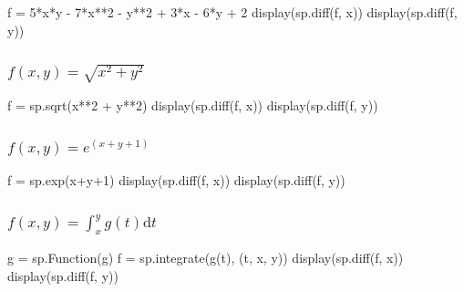 \documentclass[
  letterpaper,
  DIV=11,
  numbers=noendperiod]{scrartcl}
\newenvironment{Shaded}{\begin{snugshade}}{\end{snugshade}}
\newcommand{\NormalTok}[1]{\textcolor[rgb]{0.00,0.23,0.31}{#1}}
\begin{document}
\begin{Shaded}
\begin{Highlighting}[numbers=left,,]
\NormalTok{f = 5*x*y {-} 7*x**2 {-} y**2 + 3*x {-} 6*y + 2}
\NormalTok{display(sp.diff(f, x))}
\NormalTok{display(sp.diff(f, y))}
\end{Highlighting}
\end{Shaded}

\subsubsection{\texorpdfstring{\(f(x, y) = \sqrt{x^2+y^2}\)}{f(x, y) = \textbackslash sqrt\{x\^{}2+y\^{}2\}}}\label{fx-y-sqrtx2y2}

\begin{Shaded}
\begin{Highlighting}[numbers=left,,]
\NormalTok{f = sp.sqrt(x**2 + y**2)}
\NormalTok{display(sp.diff(f, x))}
\NormalTok{display(sp.diff(f, y))}
\end{Highlighting}
\end{Shaded}

\subsubsection{\texorpdfstring{\(f(x, y) = e^{(x+y+1)}\)}{f(x, y) = e\^{}\{(x+y+1)\}}}\label{fx-y-exy1}

\begin{Shaded}
\begin{Highlighting}[numbers=left,,]
\NormalTok{f = sp.exp(x+y+1) }
\NormalTok{display(sp.diff(f, x))}
\NormalTok{display(sp.diff(f, y))}
\end{Highlighting}
\end{Shaded}

\subsubsection{\texorpdfstring{\(f(x, y) = \int_x^y g(t) \mathrm{d}t\)}{f(x, y) = \textbackslash int\_x\^{}y g(t) \textbackslash mathrm\{d\}t}}\label{fx-y-int_xy-gt-mathrmdt}

\begin{Shaded}
\begin{Highlighting}[numbers=left,,]
\NormalTok{g = sp.Function(\textquotesingle{}g\textquotesingle{})}
\NormalTok{f = sp.integrate(g(t), (t, x, y))}
\NormalTok{display(sp.diff(f, x))}
\NormalTok{display(sp.diff(f, y))}
\end{Highlighting}
\end{Shaded}
\end{document}
